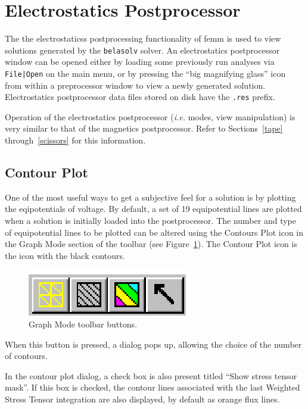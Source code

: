 \documentclass[12pt]{report}
\begin{document}
\section{Electrostatics Postprocessor}


The the electrostaticss postprocessing functionality of femm is
used to view solutions generated by the {\tt belasolv} solver.  An
electrostatics postprocessor window can be opened either by loading
some previously run analyses via {\tt File|Open} on the main menu,
or by pressing the ``big magnifying glass'' icon from within a
preprocessor window to view a newly generated solution.
Electrostatics postprocessor data files stored on disk have the
{\tt .res} prefix.

Operation of the electrostatics postprocessor ({\em i.e.} modes, view manipulation) is
very similar to that of the magnetics postprocessor.  Refer to
Sections~\ref{tape} through~\ref{scissors} for this information.

\subsection{Contour Plot}

One of the most useful ways to get a subjective feel for a solution
is by plotting the eqipotentials of voltage. By default, a set of
19 equipotential lines are plotted when a solution is initially
loaded into the postprocessor. The number and type of equipotential
lines to be plotted can be altered using the Contours Plot icon in
the Graph Mode section of the toolbar (see Figure~\ref{fig17}). The
Contour Plot icon is the icon with the black contours.

\begin{figure}[htbp]
\centerline{\includegraphics{hplotbar.ps}}
\caption{Graph Mode toolbar buttons.}
\label{fig17}
\end{figure}




When this button is pressed, a dialog pops up, allowing the choice of the
number of contours.





In the contour plot dialog, a check box is also present titled ``Show stress
tensor mask''. If this box is checked, the contour lines associated with the
last Weighted Stress Tensor integration are also displayed, by default as
orange flux lines.
\end{document}
